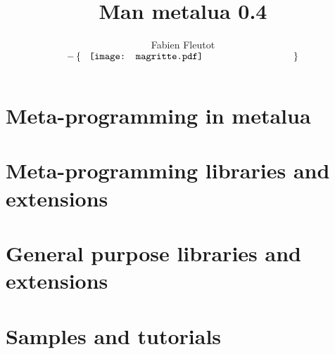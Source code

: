 \documentclass{book}
\title{Man metalua 0.4}
\author{Fabien {\sc Fleutot}\\[10mm] 
  $-\left\{\begin{minipage}{7.6cm}
      \hspace{3mm}\texttt{[image: magritte.pdf]}
    \end{minipage}\right\}$}
\begin{document}
\pagestyle{fancy}
\setlength\parskip{0.2cm}

\maketitle

\tableofcontents

\chapter[meta-programming]{Meta-programming in metalua}





\chapter[meta-libraries]{Meta-programming libraries and extensions}






\chapter[generic libraries]{General purpose libraries and extensions}




%

\chapter{Samples and tutorials}



%

\appendix


\end{document}

